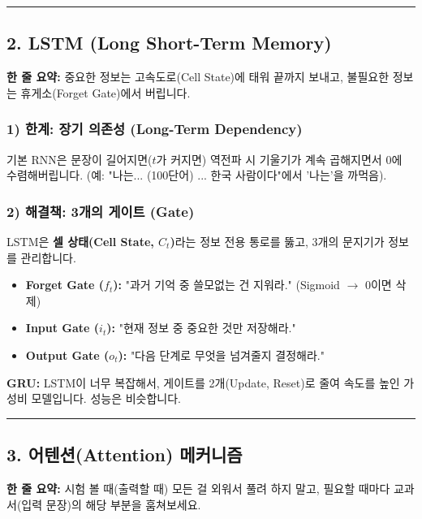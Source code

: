 \documentclass[11pt,a4paper]{book}
\theoremstyle{definition}
\begin{document}
\vspace{0.5cm}\hrule\vspace{0.5cm}

\subsection{2. LSTM (Long Short-Term Memory)}


\begin{conceptbox}[title={개념 2: 정보의 고속도로와 문지기}]
\textbf{한 줄 요약:} 중요한 정보는 고속도로(Cell State)에 태워 끝까지 보내고, 불필요한 정보는 휴게소(Forget Gate)에서 버립니다.
\end{conceptbox}

\subsubsection*{1) 한계: 장기 의존성 (Long-Term Dependency)}
기본 RNN은 문장이 길어지면($t$가 커지면) 역전파 시 기울기가 계속 곱해지면서 0에 수렴해버립니다. (예: "나는... (100단어) ... 한국 사람이다"에서 '나는'을 까먹음).

\subsubsection*{2) 해결책: 3개의 게이트 (Gate)}
LSTM은 \textbf{셀 상태(Cell State, $C_t$)}라는 정보 전용 통로를 뚫고, 3개의 문지기가 정보를 관리합니다.
\begin{itemize}
    \item \textbf{Forget Gate ($f_t$):} "과거 기억 중 쓸모없는 건 지워라." (Sigmoid $\to$ 0이면 삭제)
    \item \textbf{Input Gate ($i_t$):} "현재 정보 중 중요한 것만 저장해라."
    \item \textbf{Output Gate ($o_t$):} "다음 단계로 무엇을 넘겨줄지 결정해라."
\end{itemize}
\textbf{GRU:} LSTM이 너무 복잡해서, 게이트를 2개(Update, Reset)로 줄여 속도를 높인 가성비 모델입니다. 성능은 비슷합니다.

\vspace{0.5cm}\hrule\vspace{0.5cm}

\subsection{3. 어텐션(Attention) 메커니즘}


\begin{conceptbox}[title={개념 3: 컨닝 페이퍼 (Cheat Sheet)}]
\textbf{한 줄 요약:} 시험 볼 때(출력할 때) 모든 걸 외워서 풀려 하지 말고, 필요할 때마다 교과서(입력 문장)의 해당 부분을 훔쳐보세요.
\end{conceptbox}
\end{document}

